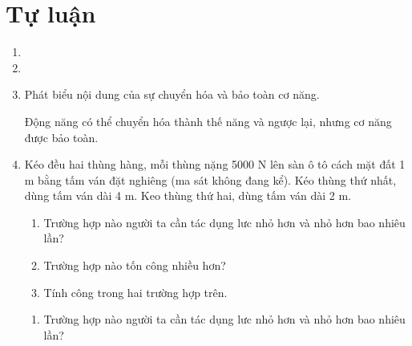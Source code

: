 \section{Tự luận}
\begin{enumerate}[label=\bfseries Câu \arabic*:]
	\item {}
	
	
	
	\item {}
	
	
	\item {}
	
	\cauhoi
	{Phát biểu nội dung của sự chuyển hóa và bảo toàn cơ năng.
	}
	
	\loigiai
	{Động năng có thể chuyển hóa thành thế năng và ngược lại, nhưng cơ năng được bảo toàn.
	}
	\item {}
	
	\cauhoi
	{Kéo đều hai thùng hàng, mỗi thùng nặng 5000 N lên sàn ô tô cách mặt đất 1 m bằng tấm ván đặt nghiêng (ma sát không đang kể). Kéo thùng thứ nhất, dùng tấm ván dài 4 m. Keo thùng thứ hai, dùng tấm ván dài 2 m.
		\begin{enumerate}
			\item Trường hợp nào người ta cần tác dụng lưc nhỏ hơn và nhỏ hơn bao nhiêu lần?
			\item Trường hợp nào tốn công nhiều hơn?
			\item Tính công trong hai trường hợp trên.
		\end{enumerate}
	}
	
	\loigiai
	{		\begin{enumerate}
			\item Trường hợp nào người ta cần tác dụng lưc nhỏ hơn và nhỏ hơn bao nhiêu lần?
			

\end{enumerate}}
\end{enumerate}
